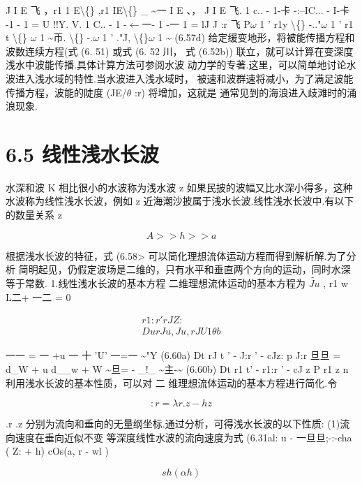 J I E 飞 ，r1 1 E\textbackslash\{\} ,r1 IE\textbackslash\{\} \_ \textasciitilde{}一 I E 、， J I E 飞. 1 c.. - 1-卡 -:--IC... - I-卡 -1 - 1 = U !!Y. V. 1 C.. - 1 -$\leftarrow$一- 1 -一 1 = lJ J :r 飞 P$\omega$ 1 ' r1y \textbackslash\{\} -.."$\omega$ 1 ' r1 t \textbackslash\{\} $\omega$ 1 \textasciitilde{}币. \textbackslash\{\} -.$\omega$ 1 ' ."J, \textbackslash\{\}$\omega$ 1 \textasciitilde{} (6.57d) 给定缓变地形，将被能传播方程和波数连续方程(式 (6. 51) 或式 (6. 52 川， 式 (6.52b)) 联立，就可以计算在变深度浅水中波能传播.具体计算方法可参阅水波 动力学的专著.这里，可以简单地讨论水波进入浅水域的特性.当水波进入浅水域时， 被速和波群速将减小，为了满足波能传播方程，波能的陡度 (JE/$\theta$ :r) 将增加，这就是 通常见到的海浪进入歧滩时的涌浪现象.

\section*{6.5  线性浅水长波}

水深和波 K 相比很小的水波称为浅水波 z 如果民披的波幅又比水深小得多，这种 水波称为线性浅水长波，例如 z 近海潮沙披属于浅水长波.线性浅水长波中.有以下 的数量关系 z

\begin{equation*}A >> h >> a\tag{6.58}\end{equation*}

根据浅水长波的特征，式 (6.58> 可以简化理想流体运动方程而得到解析解.为了分析 简明起见，仍假定波场是二维的，只有水平和垂直两个方向的运动，同时水深等于常数. 1.线性浅水长波的基本方程 二维理想流体运动的基本方程为 $\tilde{Ju}$ , r1 w L二+ 一二 = 0

\begin{gather*}
r1:r ' rJZ:\tag{6.59}\\
Du rJ u , Ju , rJ U 1\theta b
\end{gather*}

一一 = 一 +u 一 十 'U' 一=一 \textasciitilde{}"Y (6.60a) Dt rJ t ' - J:r ' - cJz: p J:r 旦旦 = d\_W + u d\_\_w + W \textasciitilde{}旦= - \_!\_ \textasciitilde{}主-\textasciitilde{} (6.60b) Dt r1 t' - r1:r ' - cJ z P r1 z n 利用浅水长波的基本性质，可以对 二 维理想流体运动的基本方程进行简化.令

\[:r = \lambda r. z - hz\]

.r .z 分别为流向和垂向的无量纲坐标.通过分析，可得浅水长波的以下性质: (1)流向速度在垂向近似不变 等深度线性水波的流向速度为式 (6.31al: u - 一旦旦;-:-cha ( Z: + h) cOs(a, r - wl )

\[sh(\alpha  h)\]

